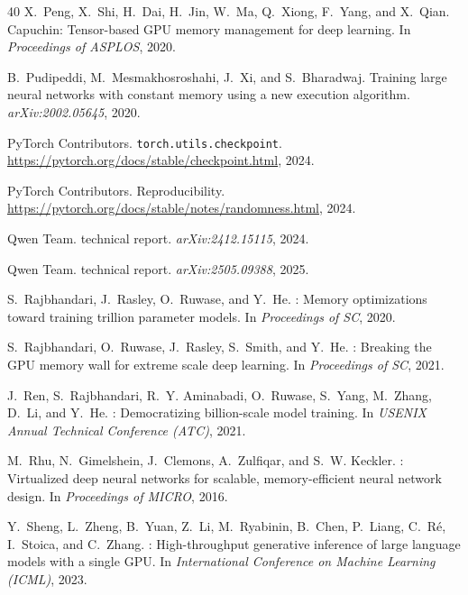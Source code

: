 \documentclass[11pt,letterpaper]{article}
\theoremstyle{definition}
\theoremstyle{plain}
\begin{document}
\begin{thebibliography}{40}
X.~Peng, X.~Shi, H.~Dai, H.~Jin, W.~Ma, Q.~Xiong, F.~Yang, and X.~Qian.
\newblock Capuchin: Tensor-based {GPU} memory management for deep learning.
\newblock In \emph{Proceedings of ASPLOS}, 2020.

B.~Pudipeddi, M.~Mesmakhosroshahi, J.~Xi, and S.~Bharadwaj.
\newblock Training large neural networks with constant memory using a new execution algorithm.
\newblock \emph{arXiv:2002.05645}, 2020.

PyTorch Contributors.
\newblock \texttt{torch.utils.checkpoint}.
\newblock \url{https://pytorch.org/docs/stable/checkpoint.html}, 2024.

PyTorch Contributors.
\newblock Reproducibility.
\newblock \url{https://pytorch.org/docs/stable/notes/randomness.html}, 2024.

Qwen Team.
 technical report.
\newblock \emph{arXiv:2412.15115}, 2024.

Qwen Team.
 technical report.
\newblock \emph{arXiv:2505.09388}, 2025.

S.~Rajbhandari, J.~Rasley, O.~Ruwase, and Y.~He.
: Memory optimizations toward training trillion parameter models.
\newblock In \emph{Proceedings of SC}, 2020.

S.~Rajbhandari, O.~Ruwase, J.~Rasley, S.~Smith, and Y.~He.
: Breaking the {GPU} memory wall for extreme scale deep learning.
\newblock In \emph{Proceedings of SC}, 2021.

J.~Ren, S.~Rajbhandari, R.~Y. Aminabadi, O.~Ruwase, S.~Yang, M.~Zhang, D.~Li, and Y.~He.
: Democratizing billion-scale model training.
\newblock In \emph{USENIX Annual Technical Conference (ATC)}, 2021.

M.~Rhu, N.~Gimelshein, J.~Clemons, A.~Zulfiqar, and S.~W. Keckler.
: Virtualized deep neural networks for scalable, memory-efficient neural network design.
\newblock In \emph{Proceedings of MICRO}, 2016.

Y.~Sheng, L.~Zheng, B.~Yuan, Z.~Li, M.~Ryabinin, B.~Chen, P.~Liang, C.~R\'e, I.~Stoica, and C.~Zhang.
: High-throughput generative inference of large language models with a single {GPU}.
\newblock In \emph{International Conference on Machine Learning (ICML)}, 2023.


\end{thebibliography}
\end{document}
